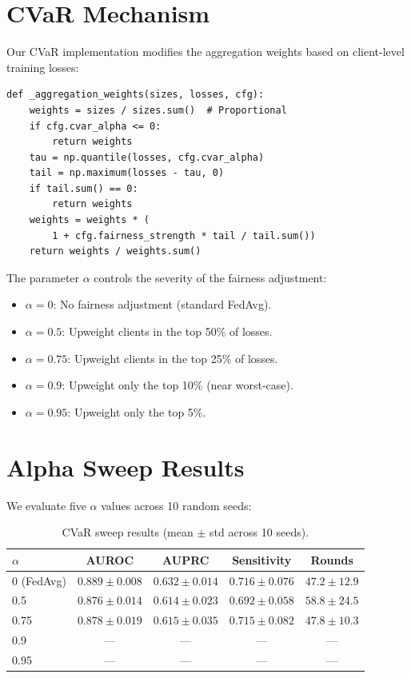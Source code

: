 \documentclass[11pt,a4paper]{report}
\begin{document}
\section{CVaR Mechanism}

Our CVaR implementation modifies the aggregation weights based on client-level training losses:

\begin{lstlisting}
def _aggregation_weights(sizes, losses, cfg):
    weights = sizes / sizes.sum()  # Proportional
    if cfg.cvar_alpha <= 0:
        return weights
    tau = np.quantile(losses, cfg.cvar_alpha)
    tail = np.maximum(losses - tau, 0)
    if tail.sum() == 0:
        return weights
    weights = weights * (
        1 + cfg.fairness_strength * tail / tail.sum())
    return weights / weights.sum()
\end{lstlisting}

The parameter $\alpha$ controls the severity of the fairness adjustment:
\begin{itemize}[leftmargin=2em]
\item $\alpha = 0$: No fairness adjustment (standard FedAvg).
\item $\alpha = 0.5$: Upweight clients in the top 50\% of losses.
\item $\alpha = 0.75$: Upweight clients in the top 25\% of losses.
\item $\alpha = 0.9$: Upweight only the top 10\% (near worst-case).
\item $\alpha = 0.95$: Upweight only the top 5\%.
\end{itemize}

\section{Alpha Sweep Results}

We evaluate five $\alpha$ values across 10 random seeds:

\begin{table}[H]
\centering
\caption{CVaR sweep results (mean $\pm$ std across 10 seeds).}
\label{tab:cvar}
\begin{tabular}{lcccc}
\toprule
\textbf{$\alpha$} & \textbf{AUROC} & \textbf{AUPRC} & \textbf{Sensitivity} & \textbf{Rounds} \\
\midrule
0 (FedAvg) & $0.889 \pm 0.008$ & $0.632 \pm 0.014$ & $0.716 \pm 0.076$ & $47.2 \pm 12.9$ \\
0.5 & $0.876 \pm 0.014$ & $0.614 \pm 0.023$ & $0.692 \pm 0.058$ & $58.8 \pm 24.5$ \\
0.75 & $0.878 \pm 0.019$ & $0.615 \pm 0.035$ & $0.715 \pm 0.082$ & $47.8 \pm 10.3$ \\
0.9 & --- & --- & --- & --- \\
0.95 & --- & --- & --- & --- \\
\bottomrule
\end{tabular}
\end{table}
\end{document}
